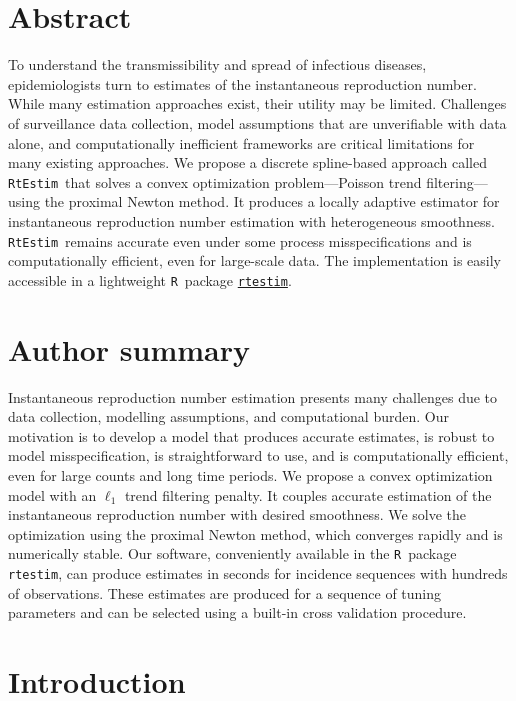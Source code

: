 \documentclass[10pt,letterpaper]{article}
\newcommand{\R}{\texttt{R}}
\def\RtEstim{\texttt{RtEstim}}
\begin{document}
\section*{Abstract}

To understand the transmissibility and spread of infectious diseases,
epidemiologists turn to estimates of the instantaneous reproduction number.
While many estimation approaches exist, their utility may be limited. 
Challenges of surveillance data collection, model assumptions
that are unverifiable with data alone, and 
computationally inefficient frameworks are critical limitations for many
existing approaches. We propose a discrete spline-based approach called 
\RtEstim\ that solves a convex optimization problem---Poisson trend filtering---using the proximal Newton method. It produces a locally adaptive 
estimator for instantaneous reproduction number estimation with heterogeneous 
smoothness. \RtEstim\ remains accurate even under some process 
misspecifications and is computationally efficient, even for large-scale 
data. The implementation is easily accessible in a lightweight \R\ 
package \href{https://dajmcdon.github.io/rtestim/index.html}{\texttt{rtestim}}.


\section*{Author summary}

Instantaneous reproduction number estimation presents many challenges due to data
collection, modelling assumptions, and computational burden. Our
motivation is to develop a model that produces accurate estimates, is robust to
model misspecification, is straightforward to use, and is computationally
efficient, even for large counts and long time periods. We propose a convex
optimization model with an $\ell_1$ trend filtering penalty. It couples accurate
estimation of the instantaneous reproduction number with desired smoothness. We
solve the optimization using the proximal Newton method, which converges rapidly
and is numerically stable. Our software, conveniently available in the \R\
package \texttt{rtestim}, can produce estimates in seconds for incidence sequences with
hundreds of observations. These estimates are produced for a sequence of tuning
parameters and can be selected using a built-in cross validation procedure. 

\linenumbers

\section{Introduction}
\label{sec:intro}
\end{document}
